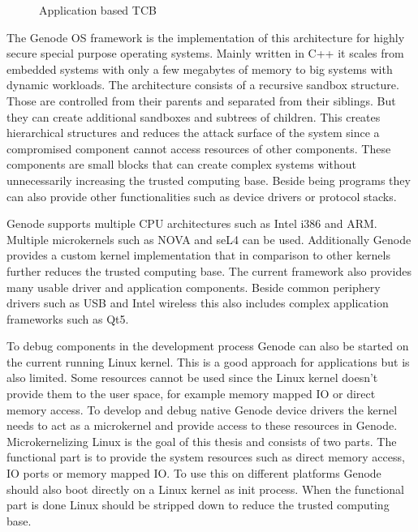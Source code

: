 \documentclass[
a4paper,
12pt,
notitlepage,
parskip=half,
DIV=11,
]{scrbook}
\begin{document}
		\begin{figure}
			\centering
			\def\svgwidth{\columnwidth}
			
			\caption{Application based TCB \citep{genode}}
			\label{fig:tcb_tree}
		\end{figure}
	
		The Genode OS framework is the implementation of this architecture for highly secure special purpose operating systems.
		Mainly written in C++ it scales from embedded systems with only a few megabytes of memory to big systems with dynamic workloads.
		The architecture consists of a recursive sandbox structure.
		Those are controlled from their parents and separated from their siblings.
		But they can create additional sandboxes and subtrees of children.
		This creates hierarchical structures and reduces the attack surface of the system since a compromised component cannot access resources of other components.
		These components are small blocks that can create complex systems without unnecessarily increasing the trusted computing base.
		Beside being programs they can also provide other functionalities such as device drivers or protocol stacks.
		
		Genode supports multiple CPU architectures such as Intel i386 and ARM.
		Multiple microkernels such as NOVA and seL4 can be used.
		Additionally Genode provides a custom kernel implementation that in comparison to other kernels further reduces the trusted computing base.
		The current framework also provides many usable driver and application components.
		Beside common periphery drivers such as USB and Intel wireless this also includes complex application frameworks such as Qt5. \citep{genode}
		
		To debug components in the development process Genode can also be started on the current running Linux kernel.
		This is a good approach for applications but is also limited.
		Some resources cannot be used since the Linux kernel doesn't provide them to the user space, for example memory mapped IO or direct memory access.
		To develop and debug native Genode device drivers the kernel needs to act as a microkernel and provide access to these resources in Genode.
		Microkernelizing Linux is the goal of this thesis and consists of two parts.
		The functional part is to provide the system resources such as direct memory access, IO ports or memory mapped IO.
		To use this on different platforms Genode should also boot directly on a Linux kernel as init process.
		When the functional part is done Linux should be stripped down to reduce the trusted computing base.
		
\end{document}
